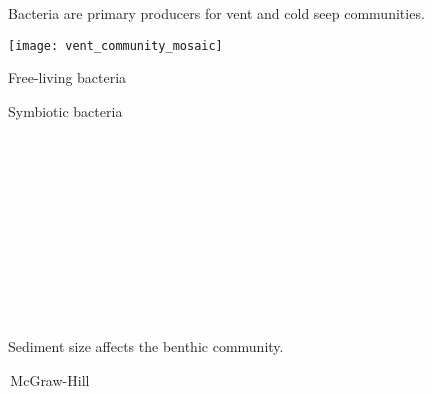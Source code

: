\documentclass[t]{beamer}
\begin{document}
\begin{frame}[t]{Bacteria are primary producers for vent and cold seep communities.}

\vspace*{-\baselineskip}

	\begin{multicols}{2}
		{\centering
		\texttt{[image: vent\_community\_mosaic]}\par}

	\columnbreak

		\hangpara Free-living bacteria

		\hangpara Symbiotic bacteria

	\end{multicols}

\end{frame}


{
\begin{frame}[b]{\textcolor{white}{NPP supports rich vent community.}}

\tiny\hfill\textcolor{white}{Ocean Networks Canada, Flickr Creative Commons.}
\end{frame}}

{
\begin{frame}[b]{\textcolor{white}{NPP supports rich cold seep community.}}

\tiny\textcolor{white}{NOAA Photo Library, Flickr Creative Commons.}
\end{frame}}

{
\begin{frame}[b]{\textcolor{white}{Vent communities last only a few hundred years.}}

\tiny\textcolor{white}{Ocean Networks Canada, Flickr Creative Commons.}
\end{frame}}

{
\begin{frame}[b]{Sediment size affects the benthic community.}

\tiny\textcopyright\,McGraw-Hill
\end{frame}}
\end{document}
